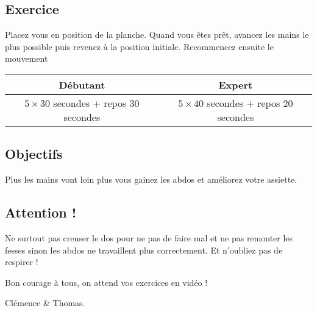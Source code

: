 \documentclass[12pt,a4paper]{article}
\subtitle{Fiche \no 8 -- Planche les mains en avant}
\begin{document}
\maketitle




\subsection*{Exercice}
	Placez vous en position de la planche. Quand vous êtes prêt, avancez les mains le plus possible puis revenez à la position initiale. Recommencez ensuite le mouvement

	\begin{center}
		\begin{tabular}{c|c}
			\textbf{Débutant} & \textbf{Expert} \\
			\hline
			$5 \times 30$ secondes + repos $30$ secondes & $5 \times 40$ secondes + repos $20$ secondes \\
		\end{tabular}
	\end{center}

\subsection*{Objectifs}
	Plus les mains vont loin plus vous gainez les abdos et améliorez votre assiette.

\subsection*{Attention !}
	Ne surtout pas creuser le dos pour ne pas de faire mal et ne pas remonter les fesses sinon les abdos ne travaillent plus correctement. Et n'oubliez pas de respirer !

\vfill
\begin{flushright}
	Bon courage à tous, on attend vos exercices en vidéo ! \phantom{Clémence et Thomas}

	Clémence \& Thomas.
\end{flushright}
\end{document}
